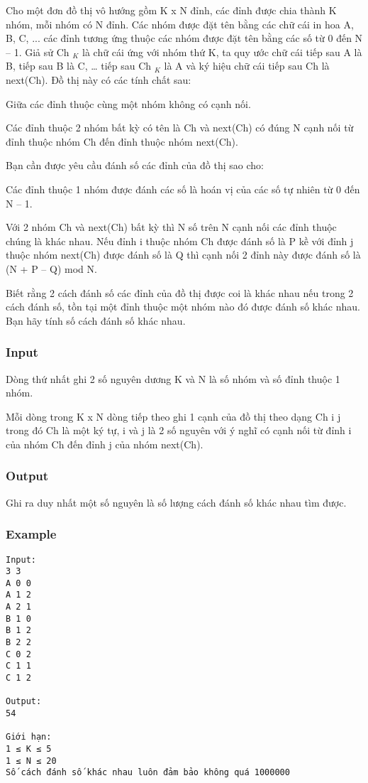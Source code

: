 



   Cho một đơn đồ thị vô hướng gồm K x N đỉnh, các đỉnh được chia thành K nhóm, mỗi nhóm có N đỉnh. Các nhóm được đặt tên bằng các chữ cái in hoa A, B, C, ... các đỉnh tương ứng thuộc các nhóm được đặt tên bằng các số từ 0 đến N – 1. Giả sử Ch   $_    K   $   là chữ cái ứng với nhóm thứ K, ta quy ước chữ cái tiếp sau A là B, tiếp sau B là C, … tiếp sau Ch   $_    K   $   là A và ký hiệu chữ cái tiếp sau Ch là next(Ch). Đồ thị này có các tính chất sau:  

   Giữa các đỉnh thuộc cùng một nhóm không có cạnh nối.  

   Các đỉnh thuộc 2 nhóm bất kỳ có tên là Ch và next(Ch) có đúng N cạnh nối từ đỉnh thuộc nhóm Ch đến đỉnh thuộc nhóm next(Ch).  

   Bạn cần được yêu cầu đánh số các đỉnh của đồ thị sao cho:  

   Các đỉnh thuộc 1 nhóm được đánh các số là hoán vị của các số tự nhiên từ 0 đến N – 1.  

   Với 2 nhóm Ch và next(Ch) bất kỳ thì N số trên N cạnh nối các đỉnh thuộc chúng là khác nhau. Nếu đỉnh i thuộc nhóm Ch được đánh số là P kề với đỉnh j thuộc nhóm next(Ch) được đánh số là Q thì cạnh nối 2 đỉnh này được đánh số là (N + P – Q) mod N.  

   Biết rằng 2 cách đánh số các đỉnh của đồ thị được coi là khác nhau nếu trong 2 cách đánh số, tồn tại một đỉnh thuộc một nhóm nào đó được đánh số khác nhau. Bạn hãy tính số cách đánh số khác nhau.  

\subsubsection{   Input  }

   Dòng thứ nhất ghi 2 số nguyên dương K và N là số nhóm và số đỉnh thuộc 1 nhóm.  

   Mỗi dòng trong K x N dòng tiếp theo ghi 1 cạnh của đồ thị theo dạng Ch i j trong đó Ch là một ký tự, i và j là 2 số nguyên với ý nghĩ có cạnh nối từ đỉnh i của nhóm Ch đến đỉnh j của nhóm next(Ch).  

\subsubsection{   Output  }

   Ghi ra duy nhất một số nguyên là số lượng cách đánh số khác nhau tìm được.  

\subsubsection{   Example  }
\begin{verbatim}
Input:
3 3
A 0 0
A 1 2
A 2 1
B 1 0
B 1 2
B 2 2
C 0 2
C 1 1
C 1 2

Output:
54

Giới hạn:
1 ≤ K ≤ 5
1 ≤ N ≤ 20
Số cách đánh số khác nhau luôn đảm bảo không quá 1000000

\end{verbatim}